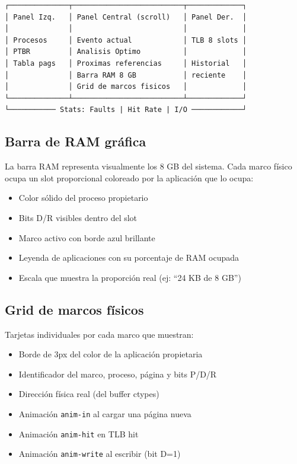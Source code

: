 \documentclass[12pt,a4paper]{article}
\begin{document}
\begin{lstlisting}[caption=Estructura de la interfaz en tres paneles]
┌──────────────┬──────────────────────────┬─────────────┐
│ Panel Izq.   │ Panel Central (scroll)   │ Panel Der.  │
│              │                          │             │
│ Procesos     │ Evento actual            │ TLB 8 slots │
│ PTBR         │ Analisis Optimo          │             │
│ Tabla pags   │ Proximas referencias     │ Historial   │
│              │ Barra RAM 8 GB           │ reciente    │
│              │ Grid de marcos fisicos   │             │
└──────────────┴──────────────────────────┴─────────────┘
└─────────── Stats: Faults | Hit Rate | I/O ────────────┘
\end{lstlisting}

\subsection{Barra de RAM gráfica}

La barra RAM representa visualmente los 8 GB del sistema. Cada marco físico ocupa
un slot proporcional coloreado por la aplicación que lo ocupa:

\begin{itemize}[leftmargin=1.5cm]
  \item Color sólido del proceso propietario
  \item Bits D/R visibles dentro del slot
  \item Marco activo con borde azul brillante
  \item Leyenda de aplicaciones con su porcentaje de RAM ocupada
  \item Escala que muestra la proporción real (ej: ``24 KB de 8 GB'')
\end{itemize}

\subsection{Grid de marcos físicos}

Tarjetas individuales por cada marco que muestran:
\begin{itemize}[leftmargin=1.5cm]
  \item Borde de 3px del color de la aplicación propietaria
  \item Identificador del marco, proceso, página y bits P/D/R
  \item Dirección física real (del buffer ctypes)
  \item Animación \texttt{anim-in} al cargar una página nueva
  \item Animación \texttt{anim-hit} en TLB hit
  \item Animación \texttt{anim-write} al escribir (bit D=1)
\end{itemize}
\end{document}
